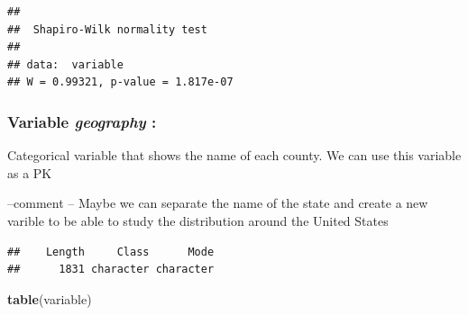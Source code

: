 \documentclass[
]{article}
\newenvironment{Shaded}{\begin{snugshade}}{\end{snugshade}}
\newcommand{\FunctionTok}[1]{\textcolor[rgb]{0.13,0.29,0.53}{\textbf{#1}}}
\newcommand{\NormalTok}[1]{#1}
\newcommand{\OtherTok}[1]{\textcolor[rgb]{0.56,0.35,0.01}{#1}}
\newcommand{\SpecialCharTok}[1]{\textcolor[rgb]{0.81,0.36,0.00}{\textbf{#1}}}
\begin{document}
\begin{verbatim}
## 
##  Shapiro-Wilk normality test
## 
## data:  variable
## W = 0.99321, p-value = 1.817e-07
\end{verbatim}

\subsubsection{\texorpdfstring{Variable \emph{geography}
:}{Variable geography :}}\label{variable-geography}

Categorical variable that shows the name of each county. We can use this
variable as a PK

--comment -- Maybe we can separate the name of the state and create a
new varible to be able to study the distribution around the United
States

\begin{Shaded}
\end{Shaded}

\begin{verbatim}
##    Length     Class      Mode 
##      1831 character character
\end{verbatim}

\begin{Shaded}
\begin{Highlighting}[]
\FunctionTok{table}\NormalTok{(variable)}
\end{Highlighting}
\end{Shaded}
\end{document}
